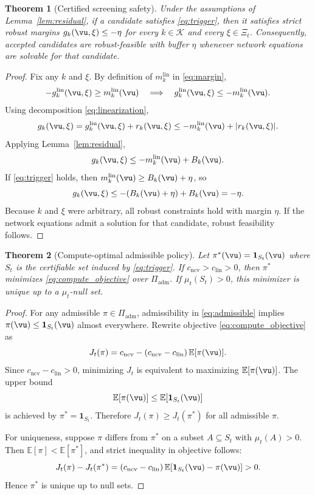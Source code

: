 \documentclass{article} %
\newtheorem{theorem}{Theorem}[section]
\begin{document}
\begin{theorem}[Certified screening safety]
\label{thm:safety}
Under the assumptions of Lemma~\ref{lem:residual}, if a candidate satisfies \eqref{eq:trigger}, then it satisfies strict robust margins $g_k(\vu,\xi)\le-\eta$ for every $k\in\mathcal{K}$ and every $\xi\in\Xi_t$. Consequently, accepted candidates are robust-feasible with buffer $\eta$ whenever network equations are solvable for that candidate.
\end{theorem}
\begin{proof}
Fix any $k$ and $\xi$. By definition of $m_k^{\mathrm{lin}}$ in \eqref{eq:margin},
\[
-g_k^{\mathrm{lin}}(\vu,\xi)\ge m_k^{\mathrm{lin}}(\vu) \quad\Longrightarrow\quad g_k^{\mathrm{lin}}(\vu,\xi)\le -m_k^{\mathrm{lin}}(\vu).
\]
Using decomposition \eqref{eq:linearization},
\[
g_k(\vu,\xi)=g_k^{\mathrm{lin}}(\vu,\xi)+r_k(\vu,\xi)\le -m_k^{\mathrm{lin}}(\vu)+|r_k(\vu,\xi)|.
\]
Applying Lemma~\ref{lem:residual},
\[
g_k(\vu,\xi)\le -m_k^{\mathrm{lin}}(\vu)+B_k(\vu).
\]
If \eqref{eq:trigger} holds, then $m_k^{\mathrm{lin}}(\vu)\ge B_k(\vu)+\eta$, so
\[
g_k(\vu,\xi)\le -(B_k(\vu)+\eta)+B_k(\vu)=-\eta.
\]
Because $k$ and $\xi$ were arbitrary, all robust constraints hold with margin $\eta$. If the network equations admit a solution for that candidate, robust feasibility follows.
\end{proof}

\begin{theorem}[Compute-optimal admissible policy]
\label{thm:optimal}
Let $\pi^*(\vu)=\mathbf{1}_{S_t}(\vu)$ where $S_t$ is the certifiable set induced by \eqref{eq:trigger}. If $c_{\mathrm{ncv}}>c_{\mathrm{lin}}>0$, then $\pi^*$ minimizes \eqref{eq:compute_objective} over $\Pi_{\mathrm{adm}}$. If $\mu_t(S_t)>0$, this minimizer is unique up to a $\mu_t$-null set.
\end{theorem}
\begin{proof}
For any admissible $\pi\in\Pi_{\mathrm{adm}}$, admissibility in \eqref{eq:admissible} implies $\pi(\vu)\le\mathbf{1}_{S_t}(\vu)$ almost everywhere. Rewrite objective \eqref{eq:compute_objective} as
\[
J_t(\pi)=c_{\mathrm{ncv}}-(c_{\mathrm{ncv}}-c_{\mathrm{lin}})\,\mathbb{E}[\pi(\vu)].
\]
Since $c_{\mathrm{ncv}}-c_{\mathrm{lin}}>0$, minimizing $J_t$ is equivalent to maximizing $\mathbb{E}[\pi(\vu)]$. The upper bound
\[
\mathbb{E}[\pi(\vu)]\le\mathbb{E}[\mathbf{1}_{S_t}(\vu)]
\]
is achieved by $\pi^*=\mathbf{1}_{S_t}$. Therefore $J_t(\pi)\ge J_t(\pi^*)$ for all admissible $\pi$.

For uniqueness, suppose $\pi$ differs from $\pi^*$ on a subset $A\subseteq S_t$ with $\mu_t(A)>0$. Then $\mathbb{E}[\pi]<\mathbb{E}[\pi^*]$, and strict inequality in objective follows:
\[
J_t(\pi)-J_t(\pi^*)=(c_{\mathrm{ncv}}-c_{\mathrm{lin}})\,\mathbb{E}[\mathbf{1}_{S_t}(\vu)-\pi(\vu)]>0.
\]
Hence $\pi^*$ is unique up to null sets.
\end{proof}
\end{document}
